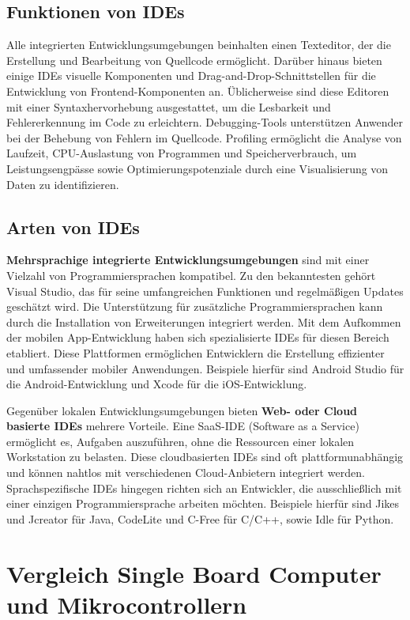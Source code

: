 \subsection{Funktionen von IDEs}
Alle integrierten Entwicklungsumgebungen beinhalten einen Texteditor, der die Erstellung und Bearbeitung von Quellcode ermöglicht. Darüber hinaus bieten einige IDEs visuelle Komponenten und Drag-and-Drop-Schnittstellen für die Entwicklung von Frontend-Komponenten an. Üblicherweise sind diese Editoren mit einer Syntaxhervorhebung ausgestattet, um die Lesbarkeit und Fehlererkennung im Code zu erleichtern. Debugging-Tools unterstützen Anwender bei der Behebung von Fehlern im Quellcode. Profiling ermöglicht die Analyse von Laufzeit, CPU-Auslastung von Programmen und Speicherverbrauch, um Leistungsengpässe sowie Optimierungspotenziale durch eine Visualisierung von Daten zu identifizieren. 

\subsection{Arten von IDEs}
\textbf{Mehrsprachige integrierte Entwicklungsumgebungen} sind mit einer Vielzahl von Programmiersprachen kompatibel. Zu den bekanntesten gehört Visual Studio, das für seine umfangreichen Funktionen und regelmäßigen Updates geschätzt wird. Die Unterstützung für zusätzliche Programmiersprachen kann durch die Installation von Erweiterungen integriert werden. Mit dem Aufkommen der mobilen App-Entwicklung haben sich spezialisierte IDEs für diesen Bereich etabliert. Diese Plattformen ermöglichen Entwicklern die Erstellung effizienter und umfassender mobiler Anwendungen. Beispiele hierfür sind Android Studio für die Android-Entwicklung und Xcode für die iOS-Entwicklung.

Gegenüber lokalen Entwicklungsumgebungen bieten \textbf{Web- oder Cloud basierte IDEs} mehrere Vorteile. Eine SaaS-IDE (Software as a Service) ermöglicht es, Aufgaben auszuführen, ohne die Ressourcen einer lokalen Workstation zu belasten. Diese cloudbasierten IDEs sind oft plattformunabhängig und können nahtlos mit verschiedenen Cloud-Anbietern integriert werden.
Sprachspezifische IDEs hingegen richten sich an Entwickler, die ausschließlich mit einer einzigen Programmiersprache arbeiten möchten. Beispiele hierfür sind Jikes und Jcreator für Java, CodeLite und C-Free für C/C++, sowie Idle für Python. \parencite{integrierteEntwicklungsumgebung}



\section{Vergleich Single Board Computer und Mikrocontrollern}
